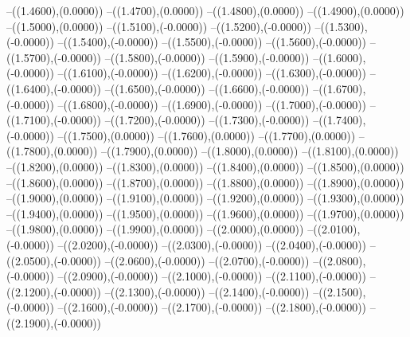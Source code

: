 {	--({\sx*(1.4600)},{\sy*(0.0000)})
	--({\sx*(1.4700)},{\sy*(0.0000)})
	--({\sx*(1.4800)},{\sy*(0.0000)})
	--({\sx*(1.4900)},{\sy*(0.0000)})
	--({\sx*(1.5000)},{\sy*(0.0000)})
	--({\sx*(1.5100)},{\sy*(-0.0000)})
	--({\sx*(1.5200)},{\sy*(-0.0000)})
	--({\sx*(1.5300)},{\sy*(-0.0000)})
	--({\sx*(1.5400)},{\sy*(-0.0000)})
	--({\sx*(1.5500)},{\sy*(-0.0000)})
	--({\sx*(1.5600)},{\sy*(-0.0000)})
	--({\sx*(1.5700)},{\sy*(-0.0000)})
	--({\sx*(1.5800)},{\sy*(-0.0000)})
	--({\sx*(1.5900)},{\sy*(-0.0000)})
	--({\sx*(1.6000)},{\sy*(-0.0000)})
	--({\sx*(1.6100)},{\sy*(-0.0000)})
	--({\sx*(1.6200)},{\sy*(-0.0000)})
	--({\sx*(1.6300)},{\sy*(-0.0000)})
	--({\sx*(1.6400)},{\sy*(-0.0000)})
	--({\sx*(1.6500)},{\sy*(-0.0000)})
	--({\sx*(1.6600)},{\sy*(-0.0000)})
	--({\sx*(1.6700)},{\sy*(-0.0000)})
	--({\sx*(1.6800)},{\sy*(-0.0000)})
	--({\sx*(1.6900)},{\sy*(-0.0000)})
	--({\sx*(1.7000)},{\sy*(-0.0000)})
	--({\sx*(1.7100)},{\sy*(-0.0000)})
	--({\sx*(1.7200)},{\sy*(-0.0000)})
	--({\sx*(1.7300)},{\sy*(-0.0000)})
	--({\sx*(1.7400)},{\sy*(-0.0000)})
	--({\sx*(1.7500)},{\sy*(0.0000)})
	--({\sx*(1.7600)},{\sy*(0.0000)})
	--({\sx*(1.7700)},{\sy*(0.0000)})
	--({\sx*(1.7800)},{\sy*(0.0000)})
	--({\sx*(1.7900)},{\sy*(0.0000)})
	--({\sx*(1.8000)},{\sy*(0.0000)})
	--({\sx*(1.8100)},{\sy*(0.0000)})
	--({\sx*(1.8200)},{\sy*(0.0000)})
	--({\sx*(1.8300)},{\sy*(0.0000)})
	--({\sx*(1.8400)},{\sy*(0.0000)})
	--({\sx*(1.8500)},{\sy*(0.0000)})
	--({\sx*(1.8600)},{\sy*(0.0000)})
	--({\sx*(1.8700)},{\sy*(0.0000)})
	--({\sx*(1.8800)},{\sy*(0.0000)})
	--({\sx*(1.8900)},{\sy*(0.0000)})
	--({\sx*(1.9000)},{\sy*(0.0000)})
	--({\sx*(1.9100)},{\sy*(0.0000)})
	--({\sx*(1.9200)},{\sy*(0.0000)})
	--({\sx*(1.9300)},{\sy*(0.0000)})
	--({\sx*(1.9400)},{\sy*(0.0000)})
	--({\sx*(1.9500)},{\sy*(0.0000)})
	--({\sx*(1.9600)},{\sy*(0.0000)})
	--({\sx*(1.9700)},{\sy*(0.0000)})
	--({\sx*(1.9800)},{\sy*(0.0000)})
	--({\sx*(1.9900)},{\sy*(0.0000)})
	--({\sx*(2.0000)},{\sy*(0.0000)})
	--({\sx*(2.0100)},{\sy*(-0.0000)})
	--({\sx*(2.0200)},{\sy*(-0.0000)})
	--({\sx*(2.0300)},{\sy*(-0.0000)})
	--({\sx*(2.0400)},{\sy*(-0.0000)})
	--({\sx*(2.0500)},{\sy*(-0.0000)})
	--({\sx*(2.0600)},{\sy*(-0.0000)})
	--({\sx*(2.0700)},{\sy*(-0.0000)})
	--({\sx*(2.0800)},{\sy*(-0.0000)})
	--({\sx*(2.0900)},{\sy*(-0.0000)})
	--({\sx*(2.1000)},{\sy*(-0.0000)})
	--({\sx*(2.1100)},{\sy*(-0.0000)})
	--({\sx*(2.1200)},{\sy*(-0.0000)})
	--({\sx*(2.1300)},{\sy*(-0.0000)})
	--({\sx*(2.1400)},{\sy*(-0.0000)})
	--({\sx*(2.1500)},{\sy*(-0.0000)})
	--({\sx*(2.1600)},{\sy*(-0.0000)})
	--({\sx*(2.1700)},{\sy*(-0.0000)})
	--({\sx*(2.1800)},{\sy*(-0.0000)})
	--({\sx*(2.1900)},{\sy*(-0.0000)})
}
